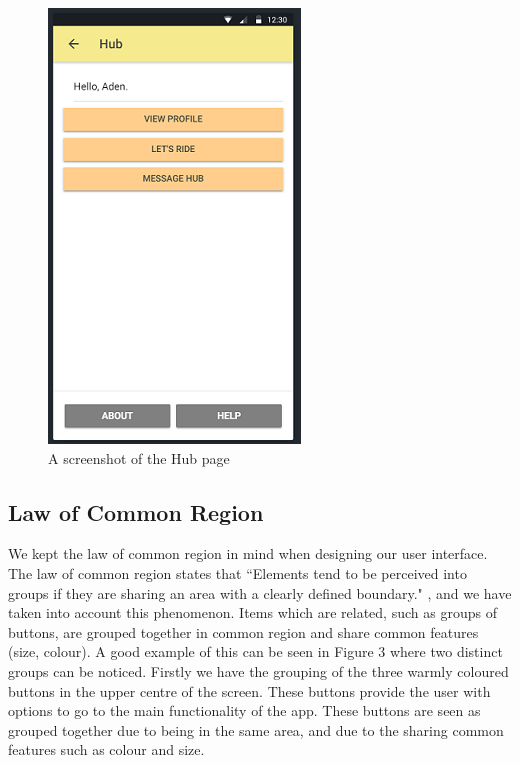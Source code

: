 \documentclass[a4paper, 11pt]{article}
\begin{document}
\begin{figure}
\begin{minipage}{.55\textwidth}
  \includegraphics[width=.7\linewidth]{grouping.png}
  \caption{A screenshot of the Hub page}
  \label{fig:test2}
\end{minipage}
\end{figure}

\subsection{Law of Common Region}
We kept the law of common region \cite{commonRegion} in mind when designing our user interface. The law of common region states that ``Elements tend to be perceived into groups if they are sharing an area with a clearly defined boundary." \cite{commonRegion}, and we have taken into account this phenomenon. Items which are related, such as groups of buttons, are grouped together in common region and share common features (size, colour). A good example of this can be seen in Figure 3 where two distinct groups can be noticed. Firstly we have the grouping of the three warmly coloured buttons in the upper centre of the screen. These buttons provide the user with options to go to the main functionality of the app. These buttons are seen as grouped together due to being in the same area, and due to the sharing common features such as colour and size.
\end{document}
